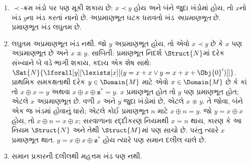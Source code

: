 \begin{enumerate}
  થાય; તેથી $x^* \prec
  y$. એ જ રીતે,
  જો $x \prec y$
  અને $x \not\approx y$
  હોય, તો $x \prec
  {^*y}$. તેથી
  $x \prec y$ અને
  $x \not\approx y$
  હોય તો દરેક
  $w \approx x$ એ
  દરેક $v \approx y$
  કરતાં $\prec$-નાનો છે.
  તદનુસાર, દરેક
  અપ્રમાણભૂત ખંડ~$[x]$
  નીચે જેવી બંને
  દિશાએ અનંત સાંકળ
  બનાવે છે:
  \[
  \cdots \prec  {^{**}x} \prec {^*}x \prec x \prec x^* \prec x^{**}
  \prec \cdots
  \]
  પૂર્ણાંકો જેવો ક્રમપ્રકાર
  હોવાથી તેને $Z$-સાંકળ
  કહે છે.
\item $\prec$-ક્રમ ખંડો
  પર પણ મૂકી શકાય છે:
  $x \prec y$ હોય અને
  બંને જુદા ખંડોમાં
  હોય, તો $x$નો
  ખંડ $y$ના ખંડ
  કરતાં નાનો છે.
  અપ્રમાણભૂત ઘટક
  ધરાવતો ખંડ
  \emph{અપ્રમાણભૂત}
  છે. પ્રમાણભૂત
  ખંડ લઘુતમ છે.
\item લઘુતમ અપ્રમાણભૂત
  ખંડ નથી. જો $y$
  અપ્રમાણભૂત હોય,
  તો એવો $x \prec y$
  છે કે $x$ પણ
  અપ્રમાણભૂત છે અને
  $x \not\approx y$.
  સાબિતી: પ્રમાણભૂત
  નિદર્શ $\Struct{N}$માં
  દરેક સંખ્યાને
  બે વડે ભાગી શકાય,
  કદાચ એક શેષ સાથે:
  $\Sat{N}{\lforall[y][\lexists[x][(y = x + x \lor y = x + x +
        \Obj{0}')]]}$.
  પ્રાથમિક સમકક્ષતાથી
  દરેક $y \in
  \Domain{M}$ માટે
  એવો $x \in
  \Domain{M}$ છે કે
  કાં તો $x \oplus x
  = y$ અથવા
  $x \oplus x \oplus
  \mathbf{z}^*= y$.
  $x$ પ્રમાણભૂત
  હોત તો $y$
  પણ પ્રમાણભૂત
  હોત; એટલે
  $x$ અપ્રમાણભૂત છે.
  વળી $x$ અને
  $y$ જુદા ખંડોમાં
  છે, એટલે
  $x \not\approx y$.
  તે જોવા, બંને
  એક જ ખંડમાં
  હોવાનું ધારો;
  એટલે કોઈ
  પ્રમાણભૂત $n$
  માટે $x \oplus n =
  y$. જો $y = x
  \oplus x$ હોય,
  તો $x \oplus n =
  x \oplus x$;
  સરવાળાના રદ્દીકરણ
  નિયમથી $x = n$
  થાય, કારણ કે
  આ નિયમ $\Struct{N}$
  અને તેથી
  $\Struct{M}$માં
  પણ સાચો છે.
  પરંતુ ત્યારે
  $x$ પ્રમાણભૂત
  થાત. $y = x
  \oplus x \oplus
  \mathbf{z}^*$ હોય
  ત્યારે પણ
  સમાન દલીલ ચાલે છે.
\item સમાન પ્રકારની
  દલીલથી મહત્તમ
  ખંડ પણ નથી.

\end{enumerate}
